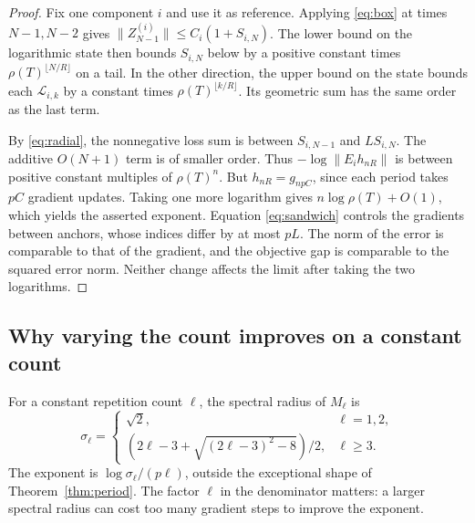 \documentclass[11pt,a4paper]{article}
\numberwithin{equation}{section}
\newcommand{\norm}[1]{\lVert#1\rVert}
\begin{document}
\begin{proof}
Fix one component \(i\) and use it as reference. Applying \eqref{eq:box} at times \(N-1,N-2\) gives \(\norm{Z_{N-1}^{(i)}}\le C_i(1+S_{i,N})\). The lower bound on the logarithmic state then bounds \(S_{i,N}\) below by a positive constant times \(\rho(T)^{\lfloor N/R\rfloor}\) on a tail. In the other direction, the upper bound on the state bounds each \(\mathcal L_{i,k}\) by a constant times \(\rho(T)^{\lfloor k/R\rfloor}\). Its geometric sum has the same order as the last term.

By \eqref{eq:radial}, the nonnegative loss sum is between \(S_{i,N-1}\) and \(L S_{i,N}\). The additive \(O(N+1)\) term is of smaller order. Thus \(-\log\norm{E_i h_{nR}}\) is between positive constant multiples of \(\rho(T)^n\). But \(h_{nR}=g_{npC}\), since each period takes \(pC\) gradient updates. Taking one more logarithm gives \(n\log\rho(T)+O(1)\), which yields the asserted exponent. Equation \eqref{eq:sandwich} controls the gradients between anchors, whose indices differ by at most \(pL\). The norm of the error is comparable to that of the gradient, and the objective gap is comparable to the squared error norm. Neither change affects the limit after taking the two logarithms.
\end{proof}

\subsection{Why varying the count improves on a constant count}
For a constant repetition count \(\ell\), the spectral radius of
\(M_\ell\) is
\[
 \sigma_\ell=
 \begin{cases}
 \sqrt2,&\ell=1,2,\\
 (2\ell-3+\sqrt{(2\ell-3)^2-8})/2,&\ell\ge3.
 \end{cases}
\]
The exponent is \(\log\sigma_\ell/(p\ell)\), outside the exceptional
shape of Theorem~\ref{thm:period}. The factor \(\ell\) in the
denominator matters: a larger spectral radius can cost too many
gradient steps to improve the exponent.
\end{document}
